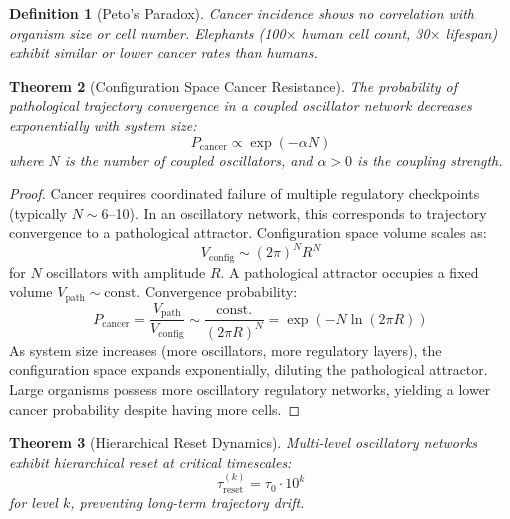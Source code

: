 \documentclass[11pt,a4paper]{article}
\newtheorem{theorem}{Theorem}[section]
\newtheorem{definition}[theorem]{Definition}
\theoremstyle{remark}
\begin{document}
\begin{definition}[Peto's Paradox]
\label{def:peto_paradox}
Cancer incidence shows no correlation with organism size or cell number. Elephants (100$\times$ human cell count, 30$\times$ lifespan) exhibit similar or lower cancer rates than humans.
\end{definition}

\begin{theorem}[Configuration Space Cancer Resistance]
\label{thm:configuration_space}
The probability of pathological trajectory convergence in a coupled oscillator network decreases exponentially with system size:
\begin{equation}
P_{\text{cancer}} \propto \exp(-\alpha N)
\end{equation}
where $N$ is the number of coupled oscillators, and $\alpha > 0$ is the coupling strength.
\end{theorem}

\begin{proof}
Cancer requires coordinated failure of multiple regulatory checkpoints (typically $N \sim 6$--10). In an oscillatory network, this corresponds to trajectory convergence to a pathological attractor. Configuration space volume scales as:
\begin{equation}
V_{\text{config}} \sim (2\pi)^N R^N
\end{equation}
for $N$ oscillators with amplitude $R$. A pathological attractor occupies a fixed volume $V_{\text{path}} \sim \text{const.}$ Convergence probability:
\begin{equation}
P_{\text{cancer}} = \frac{V_{\text{path}}}{V_{\text{config}}} \sim \frac{\text{const.}}{(2\pi R)^N} = \exp(-N\ln(2\pi R))
\end{equation}
As system size increases (more oscillators, more regulatory layers), the configuration space expands exponentially, diluting the pathological attractor. Large organisms possess more oscillatory regulatory networks, yielding a lower cancer probability despite having more cells.
\end{proof}

\begin{theorem}[Hierarchical Reset Dynamics]
\label{thm:hierarchical_reset}
Multi-level oscillatory networks exhibit hierarchical reset at critical timescales:
\begin{equation}
\tau_{\text{reset}}^{(k)} = \tau_0 \cdot 10^k
\end{equation}
for level $k$, preventing long-term trajectory drift.
\end{theorem}
\end{document}

